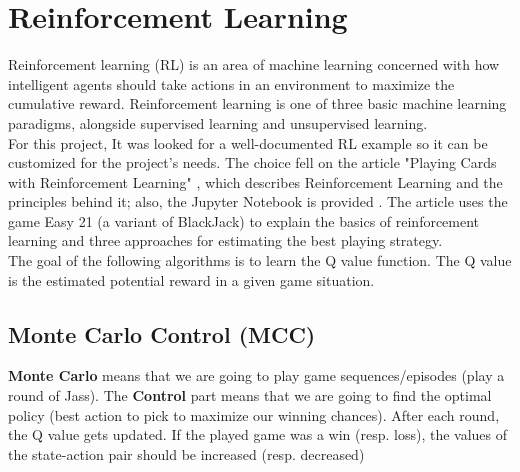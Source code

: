 
\chapter{Reinforcement Learning} %

\label{Chapter4} %


Reinforcement learning (RL) is an area of machine learning concerned with how intelligent agents should take actions in an environment to maximize the cumulative reward. Reinforcement learning is one of three basic machine learning paradigms, alongside supervised learning and unsupervised learning.  \cite{rl} \\

For this project, It was looked for a well-documented RL example so it can be customized for the project's needs. The choice fell on the article "Playing Cards with Reinforcement Learning" \cite{easy21_explanation}, which describes Reinforcement Learning and the principles behind it; also, the Jupyter Notebook is provided \cite{easy21}.
The article uses the game Easy 21 (a variant of BlackJack) to explain the basics of reinforcement learning and three approaches for estimating the best playing strategy. \\

The goal of the following algorithms is to learn the Q value function. The Q value is the estimated potential reward in a given game situation.

\section{Monte Carlo Control (MCC)}
\textbf{Monte Carlo} means that we are going to play game sequences/episodes (play a round of Jass). The \textbf{Control} part means that we are going to find the optimal policy (best action to pick to maximize our winning chances). After each round, the Q value gets updated. If the played game was a win (resp. loss), the values of the state-action pair should be increased (resp. decreased)

